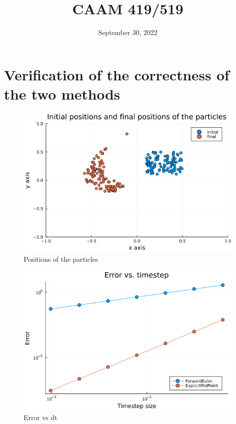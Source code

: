 \documentclass[10pt,a4paper]{article}
\title{CAAM 419/519}
\date{September 30, 2022}
\begin{document}
\maketitle

\section{Verification of the correctness of the two methods}


\begin{figure}[!ht]
        \centering \includegraphics[scale=0.5]{figures/initialandfinal.png}
        \caption{Positions of the particles}
\end{figure}

\begin{figure}[!ht]
        \centering \includegraphics[scale=0.5]{figures/errorvsdt.png}
        \caption{Error vs dt}
\end{figure}
\end{document}
